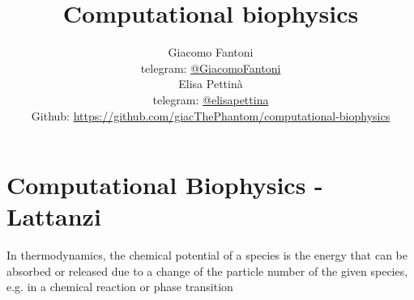 

\title{\Huge\textbf{{Computational biophysics}}}

\author{
  Giacomo Fantoni \\
  \small telegram: \href{https://t.me/GiacomoFantoni}{@GiacomoFantoni} \\[3pt]
  Elisa Pettin\`a \\
  \small telegram: \href{https://t.me/elisapettina}{@elisapettina} \\[3pt]
  \small Github: \href{https://github.com/giacThePhantom/computational-biophysics}{https://github.com/giacThePhantom/computational-biophysics}\\
}




  \maketitle
  \tableofcontents
  \part{Computational Biophysics - Lattanzi}

  In thermodynamics, the chemical potential of a species is the energy that can be absorbed or released due to a change of the particle number of the given species, e.g. in a chemical reaction or phase transition

  
  

  


